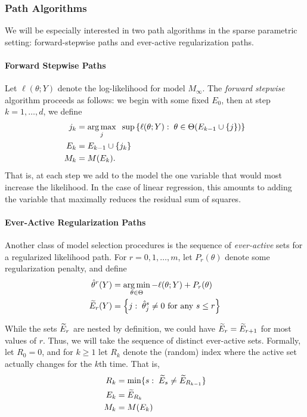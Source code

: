 \documentclass{article}
\begin{document}
\subsubsection{Path Algorithms}

We will be especially interested in two path algorithms in the sparse parametric setting: forward-stepwise paths and ever-active regularization paths.

\paragraph{Forward Stepwise Paths}
Let $\ell(\theta; Y)$ denote the log-likelihood for model
$M_\infty$. The {\em forward stepwise} algorithm proceeds as follows: we begin with some fixed $E_0$, then at step $k=1,\ldots,d$, we define
\begin{align}\label{eq:forwardDef_start}
j_k &= \operatorname*{arg\,max}_j \;\;\sup \left\{\ell(\theta; Y):\; \theta\in\Theta(E_{k-1} \cup \{j\})\right\} \\
E_k &= E_{k-1} \cup \{j_k\}\\\label{eq:forwardDef_end}
M_k &= M(E_k).
\end{align}
That is, at each step we add to the model the one variable that would most increase the likelihood. In the case of linear regression, this amounts to adding the variable that maximally reduces the residual sum of squares. 

\paragraph{Ever-Active Regularization Paths}
Another class of model selection procedures is the sequence of {\em ever-active} sets for a regularized likelihood path. For $r=0,1,\ldots,m$, let $P_r(\theta)$ denote some regularization penalty, and define
\begin{align}\label{eq:regPathDef_start}
  \hat\theta^{r}(Y) &= 
  \operatorname*{arg\,min}_{\theta\in\Theta} -\ell(\theta; Y) + P_r(\theta) \\
  \widetilde{E}_r(Y) &= \left\{j:\; \hat\theta_j^s \neq 0 
    \text{ for any } s \leq r \right\}
\end{align}

While the sets $\widetilde{E}_r$ are nested by definition, we could have $\widetilde{E}_r = \widetilde{E}_{r+1}$ for most values of $r$. Thus, we will take the sequence of distinct ever-active sets. Formally, let $R_0=0$, and for $k\geq 1$ let $R_k$ denote the (random) index where the active set actually changes for the $k$th time. That is,
\begin{align}
  R_k &= \min\{s:\; \widetilde{E}_s \neq \widetilde{E}_{R_{k-1}}\}\\
  E_k &= \widetilde{E}_{R_k}\\
  \label{eq:regPathDef_end}
  M_k &= M(E_k)
\end{align}
\end{document}
